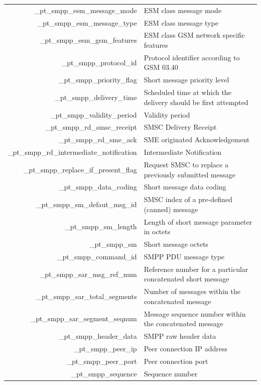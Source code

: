 \documentclass[a4paper,latin]{paper}
\begin{document}
\noindent
\begin{tabularx}{\linewidth}{ | >{\ttfamily} r | >{\ttfamily} X |}
	\hline
	\_pt\_smpp\_esm\_message\_mode				& ESM class message mode \\
	\_pt\_smpp\_esm\_message\_type				& ESM class message type \\
	\_pt\_smpp\_esm\_gsm\_features				& ESM class GSM network specific features \\
	\_pt\_smpp\_protocol\_id				& Protocol identifier according to GSM 03.40 \\
	\_pt\_smpp\_priority\_flag				& Short message priority level \\
	\_pt\_smpp\_delivery\_time				& Scheduled time at which the delivery should be first attempted \\
	\_pt\_smpp\_validity\_period				& Validity period \\
	\_pt\_smpp\_rd\_smsc\_receipt				& SMSC Delivery Receipt \\
	\_pt\_smpp\_rd\_sme\_ack				& SME originated Acknowledgement \\
	\_pt\_smpp\_rd\_intermediate\_notification		& Intermediate Notification \\
	\_pt\_smpp\_replace\_if\_present\_flag			& Request SMSC to replace a previously submitted message \\
	\_pt\_smpp\_data\_coding				& Short message data coding \\
	\_pt\_smpp\_sm\_defaut\_msg\_id				& SMSC index of a pre-defined (canned) message \\
	\_pt\_smpp\_sm\_length					& Length of short message parameter in octets \\
	\_pt\_smpp\_sm						& Short message octets \\
	\_pt\_smpp\_command\_id					& SMPP PDU message type \\
	\_pt\_smpp\_sar\_msg\_ref\_num				& Reference number for a particular concatenated short message \\
	\_pt\_smpp\_sar\_total\_segments			& Number of messages within the concatenated message \\
	\_pt\_smpp\_sar\_segment\_seqnum			& Message sequence number within the concatenated message \\
	\_pt\_smpp\_header\_data				& SMPP raw header data \\
	\_pt\_smpp\_peer\_ip					& Peer connection IP address \\
	\_pt\_smpp\_peer\_port					& Peer connection port \\
	\_pt\_smpp\_sequence					& Sequence number \\

\end{tabularx}
\end{document}
